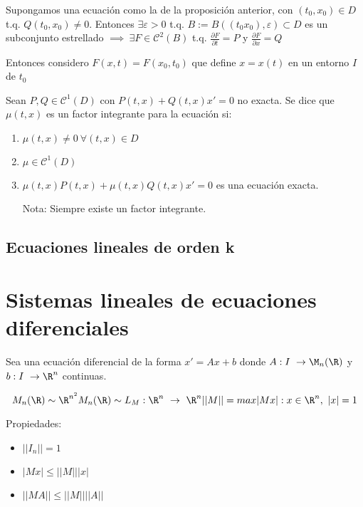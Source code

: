 Supongamos una ecuación como la de la proposición anterior, con $(t_0, x_0) \in D$ t.q. $Q(t_0, x_0) \neq 0$. Entonces $\exists \varepsilon > 0$ t.q. $B  := B( (t_0 x_0 ), \varepsilon) \subset D$ es un subconjunto estrellado $\implies \ \exists F \in \mathscr{C}^2 (B)$ t.q. $\frac{\partial F}{\partial t} = P$ y $\frac{\partial F}{\partial x} = Q$

Entonces considero  $F(x,t) = F(x_0, t_0)$ que define $x=x(t)$ en un entorno $I$ de $t_0$


\begin{ndef}
Sean $P,Q \in \mathscr{C}^1 (D)$ con $P(t,x) + Q(t,x) x' = 0$ no exacta. Se dice que $\mu (t,x)$ es un factor integrante para la ecuación si:
\begin{enumerate}
\item $\mu(t,x) \neq 0 \ \forall (t,x) \in D$
\item $\mu \in \mathscr{C}^1 (D)$
\item $\mu (t,x)P(t,x) + \mu (t,x)Q(t,x) x' = 0$ es una ecuación exacta.

Nota: Siempre existe un factor integrante.
\end{enumerate}

\end{ndef}

\subsection{Ecuaciones lineales de orden k}


\section{Sistemas lineales de ecuaciones diferenciales}

Sea una ecuación diferencial de la forma $x' = Ax+b$ donde $A: I \ \to \M_n (\R)$ y $b:I \ \to \R ^n$ continuas.

\begin{nota}

  \[
  M_n (\R) \sim \R ^{n^2} \\
  M_n (\R) \sim L_M : \R ^n \ \to \ \R ^n

  ||M|| = max { |Mx| : x \in \R ^n , \ |x| = 1}
  \]

  Propiedades:

  \begin{itemize}
  \item $||I_n || = 1$
  \item $ |Mx| \leq ||M|| |x|$
  \item $ ||MA|| \leq ||M|| ||A||$
  \end{itemize}

\end{nota}

